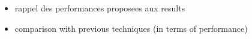 \begin{itemize}
    \item rappel des performances proposees aux results
    \item comparison with previous techniques (in terms of performance)
\end{itemize}